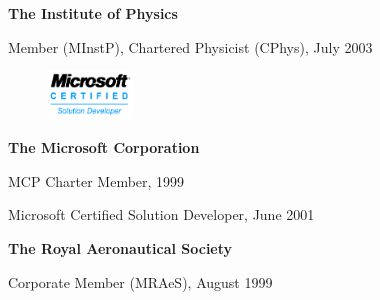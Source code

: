 \documentclass[10pt]{article}
\renewcommand{\section}[2]%
        {\pagebreak[2]\vspace{1.3\baselineskip}%
         \phantomsection\addcontentsline{toc}{section}{#1}%
         \hspace{0in}%
         \marginpar{
         \raggedright \scshape #1}#2}
\newenvironment{innerlist}[1][\enskip\textbullet]%
        {\begin{compactitem}[#1]}{\end{compactitem}}
\newcommand{\blankline}{\quad\pagebreak[2]}
\begin{document}
\textbf{The Institute of Physics}
\begin{innerlist}
\item Member (MInstP), Chartered Physicist (CPhys), July 2003
\end{innerlist}


\begin{figure}     \includegraphics[width=0.2\textwidth]{MCSD_logo}\end{figure}

\textbf{The Microsoft Corporation}
\begin{innerlist}
\item MCP Charter Member, 1999
\item Microsoft Certified Solution Developer, June 2001
%
\end{innerlist}


%

\textbf{The Royal Aeronautical Society}
\begin{innerlist}
\item Corporate Member (MRAeS), August 1999
\end{innerlist}
%
\end{document}
